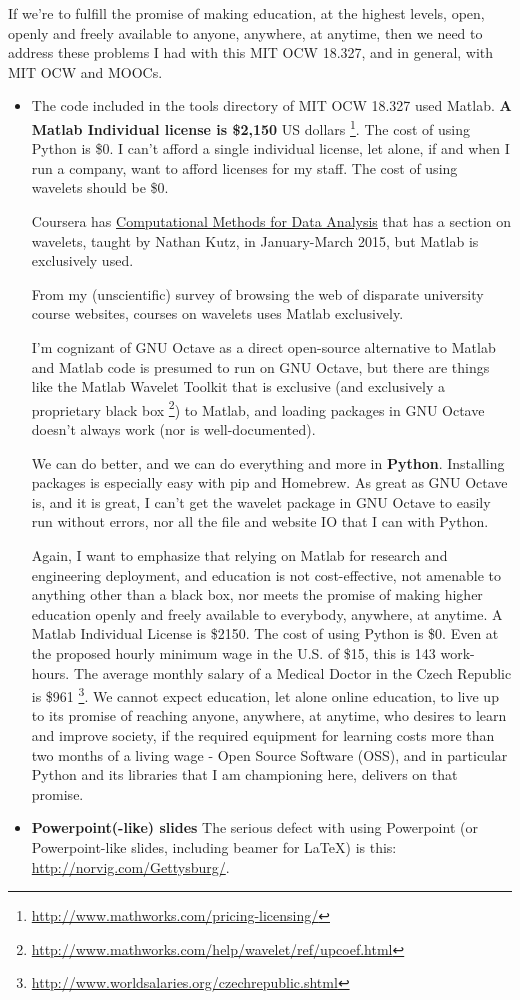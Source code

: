 \documentclass[twoside]{amsart}
\theoremstyle{plain}
\theoremstyle{definition}
\theoremstyle{remark}
\numberwithin{equation}{section}
\begin{document}
If we're to fulfill the promise of making education, at the highest levels, open, openly and freely available to anyone, anywhere, at anytime, then we need to address these problems I had with this MIT OCW 18.327, and in general, with MIT OCW and MOOCs.
\begin{itemize}
\item The code included in the tools directory of MIT OCW 18.327 used Matlab. \textbf{A Matlab Individual license is \$2,150} US dollars \footnote{\url{http://www.mathworks.com/pricing-licensing/}}.  The cost of using Python is \$0.  I can't afford a single individual license, let alone, if and when I run a company, want to afford licenses for my staff.  The cost of using wavelets should be \$0.  

Coursera has \href{https://www.coursera.org/course/compmethods}{Computational Methods for Data Analysis} that has a section on wavelets, taught by Nathan Kutz, in January-March 2015, but Matlab is exclusively used.  

From my (unscientific) survey of browsing the web of disparate university course websites, courses on wavelets uses Matlab exclusively.  

I'm cognizant of GNU Octave as a direct open-source alternative to Matlab and Matlab code is presumed to run on GNU Octave, but there are things like the Matlab Wavelet Toolkit that is exclusive (and exclusively a proprietary black box \footnote{\url{http://www.mathworks.com/help/wavelet/ref/upcoef.html}}) to Matlab, and loading packages in GNU Octave doesn't always work (nor is well-documented). 

We can do better, and we can do everything and more in \textbf{Python}.  Installing packages is especially easy with pip and Homebrew.  As great as GNU Octave is, and it is great, I can't get the wavelet package in GNU Octave to easily run without errors, nor all the file and website IO that I can with Python.  

Again, I want to emphasize that relying on Matlab for research and engineering deployment, and education is not cost-effective, not amenable to anything other than a black box, nor meets the promise of making higher education openly and freely available to everybody, anywhere, at anytime.  A Matlab Individual License is \$2150.  The cost of using Python is \$0.  Even at the proposed hourly minimum wage in the U.S. of \$15, this is 143 work-hours. The average monthly salary of a Medical Doctor in the Czech Republic is \$961 \footnote{\url{http://www.worldsalaries.org/czechrepublic.shtml}}.  We cannot expect education, let alone online education, to live up to its promise of reaching anyone, anywhere, at anytime, who desires to learn and improve society, if the required equipment for learning costs more than two months of a living wage - Open Source Software (OSS), and in particular Python and its libraries that I am championing here, delivers on that promise.  
\item \textbf{Powerpoint(-like) slides} The serious defect with using Powerpoint (or Powerpoint-like slides, including beamer for LaTeX) is this: \url{http://norvig.com/Gettysburg/}.   


\end{itemize}
\end{document}

